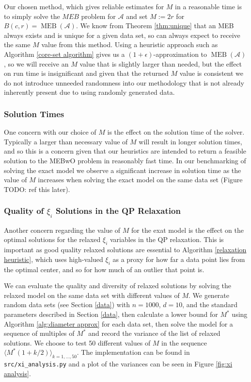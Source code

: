 \documentclass[11pt,twoside]{report}
\newcommand{\A}{\mathcal{A}} %
\DeclareMathOperator{\MEB}{MEB}
\theoremstyle{definition}
\numberwithin{theorem}{section}
\numberwithin{definition}{section}
\numberwithin{lemma}{section}
\numberwithin{proposition}{section}
\numberwithin{equation}{section}
\numberwithin{figure}{section}
\begin{document}
Our chosen method, which gives reliable estimates for $M$ in a reasonable time is to simply solve the $MEB$ problem for $\A$ and set $M:=2r$ for $B(c,r)=\MEB(\A)$. We know from Theorem \ref{thm:unique} that an MEB always exists and is unique for a given data set, so can always expect to receive the same $M$ value from this method. Using a heuristic approach such as Algorithm \ref{core-set algorithm} gives us a $(1+\epsilon)$-approximation to $\MEB(\A)$, so we will receive an $M$ value that is slightly larger than needed, but the effect on run time is insignificant and given that the returned $M$ value is consistent we do not introduce unneeded randomness into our methodology that is not already inherently present due to using randomly generated data.

\subsubsection{Solution Times}
One concern with our choice of $M$ is the effect on the solution time of the solver. Typically a larger than necessary value of $M$ will result in longer solution times, and so this is a concern given that our heuristics are intended to return a feasible solution to the MEBwO problem in reasonably fast time. In our benchmarking of solving the exact model we observe a significant increase in solution time as the value of $M$ increases when solving the exact model on the same data set (Figure TODO: ref this later). 

\subsubsection{Quality of $\xi_i$ Solutions in the QP Relaxation}
Another concern regarding the value of $M$ for the exat model is the effect on the optimal solutions for the relaxed $\xi_i$ variables in the QP relaxation. This is important as good quality relaxed solutions are essential to Algorithm \ref{relaxation heuristic}, which uses high-valued $\xi_i$ as a proxy for how far a data point lies from the optimal center, and so for how much of an outlier that point is.

We can evaluate the quality and diversity of relaxed solutions by solving the relaxed model on the same data set with different values of $M$. We generate random data sets (see Section \ref{data}) with $n=1000$, $d=10$, and the standard parameters described in Section \ref{data}, then calculate a lower bound for $M^*$ using Algorithm \ref{alg:diameter approx} for each data set, then solve the model for a sequence of multiples of $M^*$ and record the variance of the list of relaxed solutions. We choose to test 50 different values of $M$ in the sequence $\langle M^*(1+k/2)\rangle _{k=1,\ldots,50}$. The implementation can be found in \texttt{src/xi\_analysis.py} and a plot of the variances can be seen in Figure \ref{fig:xi analysis}.
\end{document}
